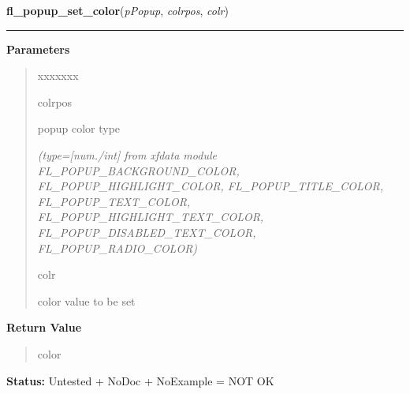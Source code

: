 \hspace{.8\funcindent}\begin{boxedminipage}{\funcwidth}

    \raggedright \textbf{fl\_popup\_set\_color}(\textit{pPopup}, \textit{colrpos}, \textit{colr})

    \vspace{-1.5ex}

    \rule{\textwidth}{0.5\fboxrule}
\setlength{\parskip}{2ex}
\setlength{\parskip}{1ex}
      \textbf{Parameters}
      \vspace{-1ex}

      \begin{quote}
        \begin{Ventry}{xxxxxxx}

          \item[colrpos]

          popup color type

            {\it (type=[num./int] from xfdata module FL\_POPUP\_BACKGROUND\_COLOR, 
FL\_POPUP\_HIGHLIGHT\_COLOR, FL\_POPUP\_TITLE\_COLOR, 
FL\_POPUP\_TEXT\_COLOR, FL\_POPUP\_HIGHLIGHT\_TEXT\_COLOR, 
FL\_POPUP\_DISABLED\_TEXT\_COLOR, FL\_POPUP\_RADIO\_COLOR)}

          \item[colr]

          color value to be set

        \end{Ventry}

      \end{quote}

      \textbf{Return Value}
    \vspace{-1ex}

      \begin{quote}
      color

      \end{quote}

\textbf{Status:} Untested + NoDoc + NoExample = NOT OK



    \end{boxedminipage}

    \label{xformslib:library:fl_popup_set_cursor}

    \vspace{0.5ex}

